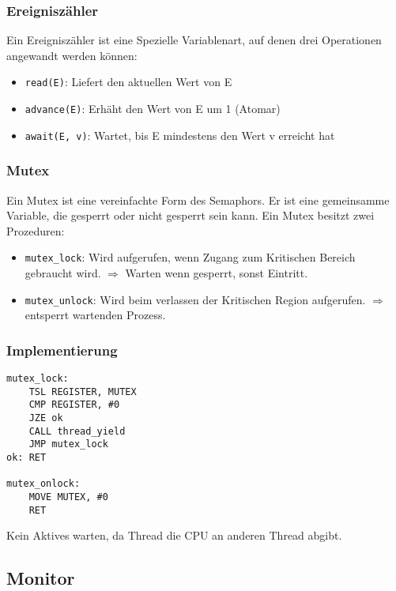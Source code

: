 \subsubsection{Ereigniszähler}

Ein Ereigniszähler ist eine Spezielle Variablenart, auf denen drei Operationen angewandt werden können:

\begin{itemize}
    \item \texttt{read(E)}: Liefert den aktuellen Wert von E
    \item \texttt{advance(E)}: Erhäht den Wert von E um 1 (Atomar)
    \item \texttt{await(E, v)}: Wartet, bis E mindestens den Wert v erreicht hat
\end{itemize}

\subsubsection{Mutex}

Ein Mutex ist eine vereinfachte Form des Semaphors. Er ist eine gemeinsamme Variable, die gesperrt oder nicht gesperrt sein kann. Ein Mutex besitzt zwei Prozeduren:

\begin{itemize}
    \item \texttt{mutex\_lock}: Wird aufgerufen, wenn Zugang zum Kritischen Bereich gebraucht wird. $\Rightarrow{}$ Warten wenn gesperrt, sonst Eintritt.
    \item \texttt{mutex\_unlock}: Wird beim verlassen der Kritischen Region aufgerufen. $\Rightarrow$ entsperrt wartenden Prozess.
\end{itemize}

\subsubsection*{Implementierung}

\begin{lstlisting}[language={[x86masm]Assembler}]
mutex_lock:
    TSL REGISTER, MUTEX
    CMP REGISTER, #0
    JZE ok
    CALL thread_yield
    JMP mutex_lock
ok: RET

mutex_onlock:
    MOVE MUTEX, #0
    RET 
\end{lstlisting}

Kein Aktives warten, da Thread die CPU an anderen Thread abgibt.

\subsection{Monitor}

